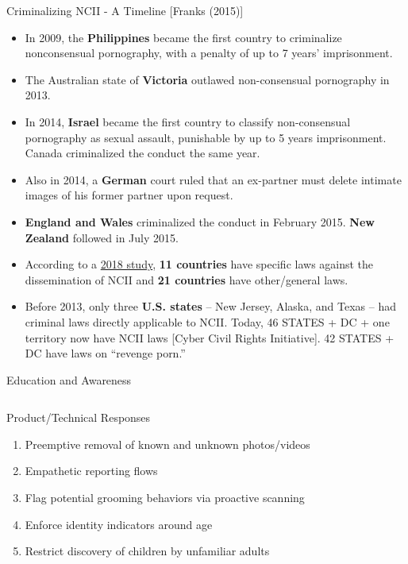 \documentclass[nobackground,dvipsnames,table,aspectratio=169]{beamer}
\begin{document}
\begin{frame}{Criminalizing NCII - A Timeline [Franks (2015)]}
    \begin{itemize}
        \item In 2009, the \textbf{Philippines} became the first country to criminalize nonconsensual pornography, with a penalty of up to 7 years’ imprisonment.
        \item The Australian state of \textbf{Victoria} outlawed non-consensual pornography in 2013.
        \item In 2014, \textbf{Israel} became the first country to classify non-consensual pornography as sexual assault, punishable by up to 5 years imprisonment. Canada criminalized the conduct the same year.
        \item Also in 2014, a \textbf{German} court ruled that an ex-partner must delete intimate images of his former partner upon request.
        \item \textbf{England and Wales} criminalized the conduct in February 2015. \textbf{New Zealand} followed in July 2015.
        \item According to a \href{https://www.internetlab.org.br/wp-content/uploads/2018/11/Fighting_the_Dissemination_of_Non.pdf}{2018 study}, \textbf{11 countries} have specific laws against the dissemination of NCII and \textbf{21 countries} have other/general laws.
        \item Before 2013, only three \textbf{U.S. states} – New Jersey, Alaska, and Texas – had criminal laws directly applicable to NCII. Today, 46 STATES + DC + one territory now have NCII laws [Cyber Civil Rights Initiative]. 42 STATES + DC have laws on “revenge porn.”
    \end{itemize}
\end{frame}

\begin{frame}{Education and Awareness}
    \centering
    \begin{columns}
    \end{columns}
\end{frame}

\begin{frame}{}
    \thispagestyle{empty}
\end{frame}

\begin{frame}{Product/Technical Responses}
    \large
    \begin{enumerate}
        \item Preemptive removal of known and unknown photos/videos
        \item Empathetic reporting flows
        \item Flag potential grooming behaviors via proactive scanning
        \item Enforce identity indicators around age
        \item Restrict discovery of children by unfamiliar adults
    \end{enumerate}
\end{frame}
\end{document}
